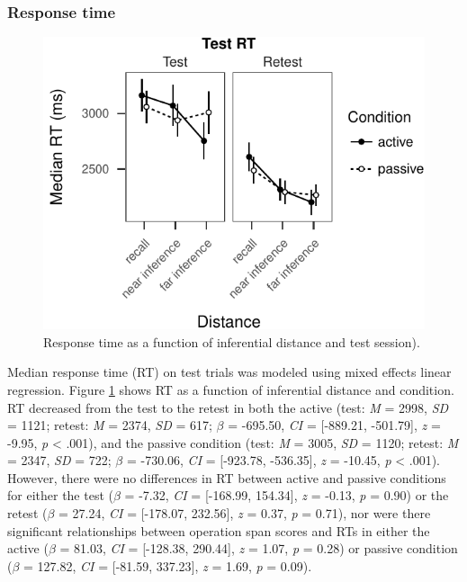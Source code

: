 \documentclass[floatsintext,man]{apa6}
\theoremstyle{definition}
\theoremstyle{definition}
\theoremstyle{definition}
\theoremstyle{remark}
\begin{document}
\subsubsection{Response time}\label{response-time}

\begin{figure}
\centering
\includegraphics{active_transitive_inference_files/figure-latex/unnamed-chunk-4-1.pdf}
\caption{\label{fig:unnamed-chunk-4}Response time as a function of
inferential distance and test session). \label{fig_rt}}
\end{figure}

Median response time (RT) on test trials was modeled using mixed effects
linear regression. Figure \ref{fig_rt} shows RT as a function of
inferential distance and condition. RT decreased from the test to the
retest in both the active (test: \emph{M} = 2998, \emph{SD} = 1121;
retest: \emph{M} = 2374, \emph{SD} = 617; \(\beta\) = -695.50, \emph{CI}
= {[}-889.21, -501.79{]}, \emph{z} = -9.95, \emph{p} \textless{} .001),
and the passive condition (test: \emph{M} = 3005, \emph{SD} = 1120;
retest: \emph{M} = 2347, \emph{SD} = 722; \(\beta\) = -730.06, \emph{CI}
= {[}-923.78, -536.35{]}, \emph{z} = -10.45, \emph{p} \textless{} .001).
However, there were no differences in RT between active and passive
conditions for either the test (\(\beta\) = -7.32, \emph{CI} =
{[}-168.99, 154.34{]}, \emph{z} = -0.13, \emph{p} = 0.90) or the retest
(\(\beta\) = 27.24, \emph{CI} = {[}-178.07, 232.56{]}, \emph{z} = 0.37,
\emph{p} = 0.71), nor were there significant relationships between
operation span scores and RTs in either the active (\(\beta\) = 81.03,
\emph{CI} = {[}-128.38, 290.44{]}, \emph{z} = 1.07, \emph{p} = 0.28) or
passive condition (\(\beta\) = 127.82, \emph{CI} = {[}-81.59, 337.23{]},
\emph{z} = 1.69, \emph{p} = 0.09).
\end{document}
